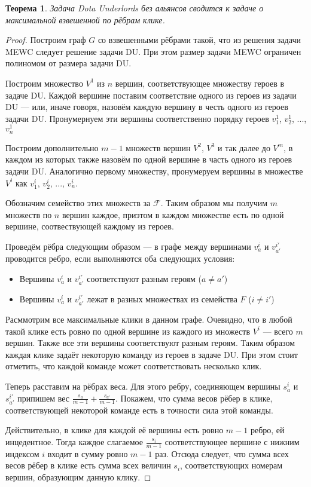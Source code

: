 \documentclass{article}
\newtheorem{theorem}{Теорема}
\begin{document}
\begin{theorem}
\label{trivial_case}
    Задача Dota Underlords без альянсов сводится к задаче о максимальной взвешенной по рёбрам клике.
\end{theorem}
\begin{proof}
    Построим граф $G$ со взвешенными рёбрами такой, что из решения задачи MEWC следует решение задачи DU. При этом размер задачи MEWC ограничен полиномом от размера задачи DU. 
    
    Построим множество $V^1$ из $n$ вершин, соответствующее множеству героев в задаче DU. Каждой вершине поставим соответствие одного из героев из задачи DU --- или, иначе говоря, назовём каждую вершину в честь одного из героев задачи DU. Пронумернуем эти вершины соответственно порядку героев $v_1^1$, $v_2^1$, ..., $v_n^1$
    
    Построим дополнительно $m-1$ множеств вершин $V^2$, $V^3$ и так далее до $V^m$, в каждом из которых также назовём по одной вершине в часть одного из героев задачи DU. Аналогично первому множеству, пронумеруем вершины в множестве $V^i$ как $v_1^i$, $v_2^i$, ..., $v_n^i$.
    
    Обозначим семейство этих множеств за $\mathcal{F}$. Таким образом мы получим $m$ множеств по $n$ вершин каждое, приэтом в каждом множестве есть по одной вершине, соотвествующей каждому из героев.
    
    Проведём рёбра следующим образом --- в графе между вершинами $v_a^i$ и $v_{a'}^{i'}$ проводится ребро, если выполняются оба следующих условия:
    \begin{itemize}
        \item Вершины $v_a^i$ и $v_{a'}^{i'}$ соответствуют разным героям ($a \neq a'$)
        \item Вершины $v_a^i$ и $v_{a'}^{i'}$ лежат в разных множествах из семейства $F$ ($i \neq i'$)
    \end{itemize}
    
    Расммотрим все максимальные клики в данном графе. Очевидно, что в любой такой клике есть ровно по одной вершине из каждого из множеств $V^i$ --- всего $m$ вершин. Также все эти вершины соответствуют разным героям. Таким образом каждая клике задаёт некоторую команду из героев в задаче DU. При этом стоит отметить, что каждой команде может соответствовать несколько клик.
    
    Теперь расставим на рёбрах веса. Для этого ребру, соединяющем вершины $s_a^i$ и $s_{a'}^{i'}$ припишем вес $\frac{s_a}{m-1} + \frac{s_{a'}}{m-1}$. Покажем, что сумма весов рёбер в клике, соответствующей некоторой команде есть в точности сила этой команды. 
    
    Действительно, в клике для каждой её вершины есть ровно $m-1$ ребро, ей инцедентное. Тогда каждое слагаемое $\frac{s_i}{m-1}$ соответствующее вершине с нижним индексом $i$ входит в сумму ровно $m-1$ раз. Отсюда следует, что сумма всех весов рёбер в клике есть сумма всех величин $s_i$, соответствующих номерам вершин, образующим данную клику.
\end{proof}
\end{document}
